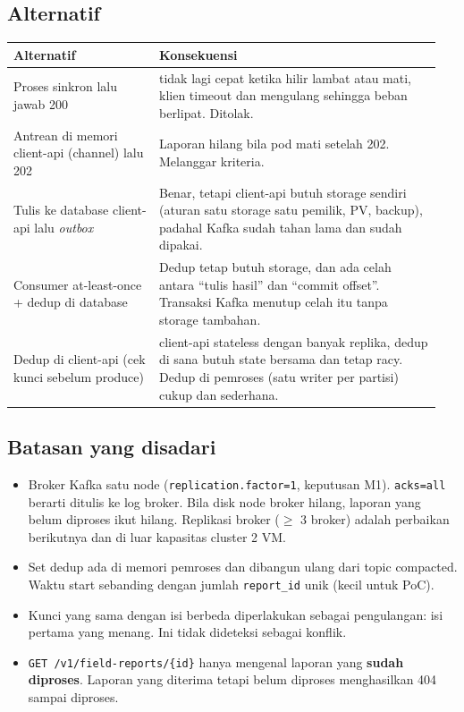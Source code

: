 \subsection{Alternatif}

{\small
\begin{longtable}{@{}>{\raggedright\arraybackslash}p{0.321\linewidth}>{\raggedright\arraybackslash}p{0.625\linewidth}@{}}
\toprule
\textbf{Alternatif} & \textbf{Konsekuensi} \\
\midrule
\endhead
Proses sinkron lalu jawab 200 & 202 tidak lagi cepat ketika hilir lambat atau mati, klien timeout dan mengulang sehingga beban berlipat. Ditolak. \\
Antrean di memori client-api (channel) lalu 202 & Laporan hilang bila pod mati setelah 202. Melanggar kriteria. \\
Tulis ke database client-api lalu \emph{outbox} & Benar, tetapi client-api butuh storage sendiri (aturan satu storage satu pemilik, PV, backup), padahal Kafka sudah tahan lama dan sudah dipakai. \\
Consumer at-least-once + dedup di database & Dedup tetap butuh storage, dan ada celah antara ``tulis hasil'' dan ``commit offset''. Transaksi Kafka menutup celah itu tanpa storage tambahan. \\
Dedup di client-api (cek kunci sebelum produce) & client-api stateless dengan banyak replika, dedup di sana butuh state bersama dan tetap racy. Dedup di pemroses (satu writer per partisi) cukup dan sederhana. \\
\bottomrule
\end{longtable}
}

\subsection{Batasan yang disadari}

\begin{itemize}
\item Broker Kafka satu node (\texttt{replication.\allowbreak{}factor=\allowbreak{}1}, keputusan M1). \texttt{acks=\allowbreak{}all} berarti ditulis ke log broker. Bila disk node broker hilang, laporan yang belum diproses ikut hilang. Replikasi broker ($\ge$ 3 broker) adalah perbaikan berikutnya dan di luar kapasitas cluster 2 VM.
\item Set dedup ada di memori pemroses dan dibangun ulang dari topic compacted. Waktu start sebanding dengan jumlah \texttt{report\_\allowbreak{}id} unik (kecil untuk PoC).
\item Kunci yang sama dengan isi berbeda diperlakukan sebagai pengulangan: isi pertama yang menang. Ini tidak dideteksi sebagai konflik.
\item \texttt{GET /\allowbreak{}v1/\allowbreak{}field-\allowbreak{}reports/\allowbreak{}\{id\}} hanya mengenal laporan yang \textbf{sudah diproses}. Laporan yang diterima tetapi belum diproses menghasilkan 404 sampai diproses.
\end{itemize}
